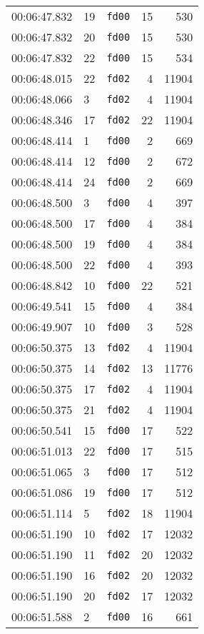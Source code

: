 \documentclass{article}
\begin{document}
\begin{longtable}{lllrr}
00:06:47.832 & 19 & \texttt{fd00} & 15 & 530 \\
00:06:47.832 & 20 & \texttt{fd00} & 15 & 530 \\
00:06:47.832 & 22 & \texttt{fd00} & 15 & 534 \\
00:06:48.015 & 22 & \texttt{fd02} & 4 & 11904 \\
00:06:48.066 & 3 & \texttt{fd02} & 4 & 11904 \\
00:06:48.346 & 17 & \texttt{fd02} & 22 & 11904 \\
00:06:48.414 & 1 & \texttt{fd00} & 2 & 669 \\
00:06:48.414 & 12 & \texttt{fd00} & 2 & 672 \\
00:06:48.414 & 24 & \texttt{fd00} & 2 & 669 \\
00:06:48.500 & 3 & \texttt{fd00} & 4 & 397 \\
00:06:48.500 & 17 & \texttt{fd00} & 4 & 384 \\
00:06:48.500 & 19 & \texttt{fd00} & 4 & 384 \\
00:06:48.500 & 22 & \texttt{fd00} & 4 & 393 \\
00:06:48.842 & 10 & \texttt{fd00} & 22 & 521 \\
00:06:49.541 & 15 & \texttt{fd00} & 4 & 384 \\
00:06:49.907 & 10 & \texttt{fd00} & 3 & 528 \\
00:06:50.375 & 13 & \texttt{fd02} & 4 & 11904 \\
00:06:50.375 & 14 & \texttt{fd02} & 13 & 11776 \\
00:06:50.375 & 17 & \texttt{fd02} & 4 & 11904 \\
00:06:50.375 & 21 & \texttt{fd02} & 4 & 11904 \\
00:06:50.541 & 15 & \texttt{fd00} & 17 & 522 \\
00:06:51.013 & 22 & \texttt{fd00} & 17 & 515 \\
00:06:51.065 & 3 & \texttt{fd00} & 17 & 512 \\
00:06:51.086 & 19 & \texttt{fd00} & 17 & 512 \\
00:06:51.114 & 5 & \texttt{fd02} & 18 & 11904 \\
00:06:51.190 & 10 & \texttt{fd02} & 17 & 12032 \\
00:06:51.190 & 11 & \texttt{fd02} & 20 & 12032 \\
00:06:51.190 & 16 & \texttt{fd02} & 20 & 12032 \\
00:06:51.190 & 20 & \texttt{fd02} & 17 & 12032 \\
00:06:51.588 & 2 & \texttt{fd00} & 16 & 661 \\

\end{longtable}
\end{document}
